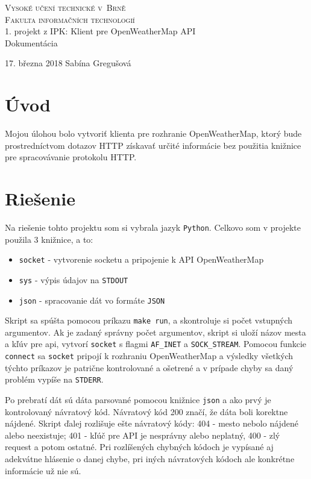 \documentclass[11pt, a4paper]{article}
\begin{document}
\begin{titlepage}
\begin{center}
\Huge
\textsc{Vysoké učení technické v~Brně}\\
\huge
\textsc{Fakulta informačních technologií}\\
\LARGE 1. projekt z IPK: Klient pre OpenWeatherMap API\\
\Huge Dokumentácia
\end{center}
{\Large 17. března 2018 \hfill
Sabína Gregušová}
\end{titlepage}

\section{Úvod}

Mojou úlohou bolo vytvoriť klienta pre rozhranie OpenWeatherMap, ktorý bude prostredníctvom dotazov HTTP získavať určité informácie bez použitia knižnice pre spracovávanie protokolu HTTP.
 \section{Riešenie}
Na riešenie tohto projektu som si vybrala jazyk \texttt{Python}. Celkovo som v projekte použila 3 knižnice, a to:
\begin{itemize}
\item \texttt{socket} - vytvorenie socketu a pripojenie k API OpenWeatherMap
\item \texttt{sys} - výpis údajov na \texttt{STDOUT}
\item \texttt{json} - spracovanie dát vo formáte \texttt{JSON}
\end{itemize}

Skript sa spúšta pomocou príkazu \texttt{make run}, a skontroluje si počet vstupných argumentov. Ak je zadaný správny počet argumentov, skript si uloží názov mesta a kľúv pre api, vytvorí \texttt{socket} s flagmi \texttt{AF\_INET} a \texttt{SOCK\_STREAM}. Pomocou funkcie \texttt{connect} sa \texttt{socket} pripojí k rozhraniu OpenWeatherMap a výsledky všetkých týchto príkazov je patrične kontrolované a ošetrené a v prípade chyby sa daný problém vypíše na \texttt{STDERR}.

Po prebratí dát sú dáta parsované pomocou knižnice \texttt{json} a ako prvý je kontrolovaný návratový kód. Návratový kód 200 značí, že dáta boli korektne nájdené. Skript ďalej rozlišuje ešte návratový kódy: 404 - mesto nebolo nájdené alebo neexistuje; 401 - kľúč pre API je nesprávny alebo neplatný, 400 - zlý request a potom ostatné. Pri rozlíšených chybných kódoch je vypísané aj adekvátne hlásenie o danej chybe, pri iných návratových kódoch ale konkrétne informácie už nie sú.
\end{document}
